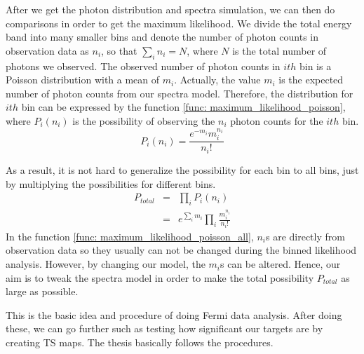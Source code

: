 \documentclass[12pt]{report}
\begin{document}
          After we get the photon distribution and spectra simulation, 
          we can then do comparisons in order to get 
          the maximum likelihood. We divide the total energy band into many smaller bins and denote
          the number of photon counts in observation data as $n_{i}$, so that $\sum_{i}^{}n_{i} = N$, 
          where $N$ is the total number of photons we observed. The observed number of photon counts
          in $ith$ bin is a Poisson distribution with a mean of $m_{i}$. Actually, the value $m_{i}$ is the 
          expected number of photon counts from our spectra model. Therefore, the distribution for $ith$ bin
          can be expressed by the function \ref{func: maximum_likelihood_poisson}, where 
          $P_{i}\left(n_{i}\right)$ is the possibility of observing the $n_{i}$ photon counts for the $ith$
          bin. 
          \begin{equation}
            P_{i}\left(n_{i}\right) = \frac{e^{-m_{i}} m_{i}^{n_{i}}}{n_{i}!}
            \label{func: maximum_likelihood_poisson}
          \end{equation}

          As a result, it is not hard to generalize the possibility for each bin to all bins, just 
          by multiplying the possibilities for different bins.
          \begin{eqnarray}
            P_{total} &=& \prod_{i}^{}P_{i}\left(n_{i}\right) \nonumber \\ 
                      &=& e^{\sum_{i}^{}m_i}\prod_{i}^{}\frac{m_{i}^{n_i}}{n_i!}
            \label{func: maximum_likelihood_poisson_all}
          \end{eqnarray}
          In the function \ref{func: maximum_likelihood_poisson_all}, $n_i$s are directly 
          from observation data so they usually can not be changed during the binned likelihood 
          analysis. However, by changing our model, the $m_i$s can be altered. 
          Hence, our aim is to tweak the spectra model in order to make the total possibility 
          $P_{total}$ as large as possible. 

          This is the basic idea and procedure of doing Fermi data analysis. After doing these,
          we can go further such as testing how significant our targets are by creating TS maps. The 
          thesis basically follows the procedures. 
\end{document}
